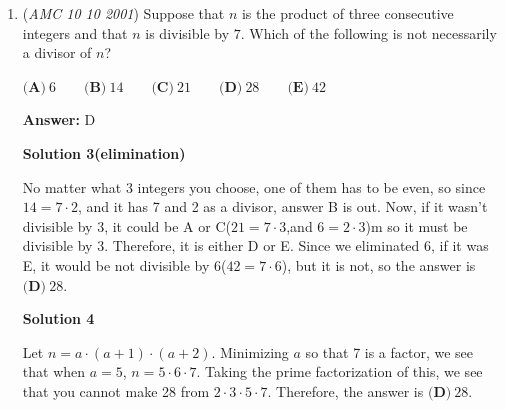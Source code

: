 \begin{enumerate}
\textbf{Solution 2}

We can make the $n^\text{th}$ ring by removing a square of side length $2n-1$ from a square of side length $2n+1$. 

 This ring contains $(2n+1)^2-(2n-1)^2=(4n^2+4n+1)-(4n^2-4n+1)=8n$ unit squares.

 Thus, the $100^\text{th}$ ring has $8 \times 100 = \boxed{\textbf{(C)}\ 800}$ unit squares.

 



\textbf{Solution 3 (Less Rigorous)}

Notice that the first ring around the center square contains $8$ unit squares, the second ring contains $16$ unit squares, the third contains $24$ unit squares, and so on. The number of squares in the $n^\text{th}$ ring is determined by the expression $8 \times n$. Thus, the number of unit squares in the $100^\text{th}$ ring is equal to $8 \times 100$, which equals $\boxed{\textbf{(C) }800}$ unit squares.

 -Darth\_Cadet

 


	\item (\textit{AMC 10 10 2001}) Suppose that $n$ is the product of three consecutive integers and that $n$ is divisible by $7$. Which of the following is not necessarily a divisor of $n$?


 $\textbf{(A)}\ 6 \qquad \textbf{(B)}\ 14 \qquad \textbf{(C)}\ 21 \qquad \textbf{(D)}\ 28 \qquad \textbf{(E)}\ 42$

 \textbf{Answer: }D



\textbf{Solution 3(elimination)}

No matter what 3 integers you choose, one of them has to be even, so since $14 = 7 \cdot 2$, and it has 7 and 2 as a divisor, answer B is out. Now, if it wasn't divisible by 3, it could be A or C($21 = 7 \cdot 3$,and $6 = 2 \cdot 3$)m so it must be divisible by 3. Therefore, it is either D or E. Since we eliminated 6, if it was E, it would be not divisible by 6($42 = 7 \cdot 6$), but it is not, so the answer is $\boxed{\textbf{(D)}\ 28}$.

 



\textbf{Solution 4}

Let $n = a \cdot (a + 1) \cdot (a + 2)$. Minimizing $a$ so that 7 is a factor, we see that when $a = 5$, $n = 5 \cdot 6 \cdot 7$. Taking the prime factorization of this, we see that you cannot make 28 from $2 \cdot 3 \cdot 5 \cdot 7$. Therefore, the answer is $\boxed{\textbf{(D)}\ 28}$.


\end{enumerate}
